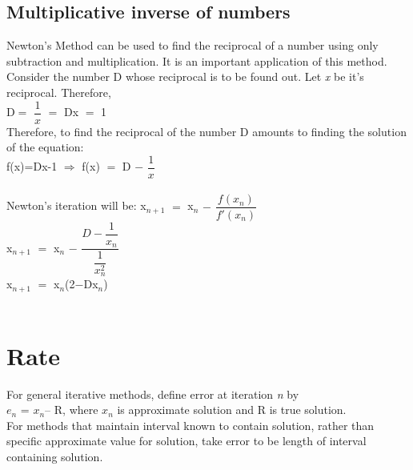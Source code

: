 \documentclass[15pt]{report}
\begin{document}
\subsection*{Multiplicative inverse of numbers}
Newton's Method can be used to find the reciprocal of a number using only subtraction and multiplication. It is an important application of this method.\\
Consider the number D whose reciprocal is to be found out. Let \textit{x} be it's reciprocal. Therefore, \\
D$=$ $\dfrac{1}{x}$ $=$ Dx $=$ 1\\
Therefore, to find the reciprocal of the number D amounts to finding the solution of the equation:\\
f(x)=Dx-1 $\Longrightarrow$ f(x) $=$ D $-$ $\dfrac{1}{x}$\\ \\
Newton's iteration will be:
x$_{n+1}$ $=$ x$_{n}$ $-$ $\dfrac{f(x_{n})}{f'(x_{n})}$\\
x$_{n+1}$ $=$ x$_{n}$ $-$ $\dfrac{D-\dfrac{1}{x_{n}}}{\dfrac{1}{x_{n}^{2}}}$ \\
x$_{n+1}$ $=$ x$_{n}$(2$-$Dx$_{n}$)\\ \\	
\section*{Rate}
For general iterative methods, define error at iteration \textit{n} by \\
$e_{n}$ = $x_{n}$– R, where $x_{n}$ is approximate solution and R is true solution.\\For methods that maintain interval known to contain solution, rather than specific approximate value for solution, take error to be length of interval containing solution.
\end{document}
